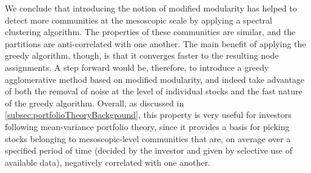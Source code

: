 We conclude that introducing the notion of modified modularity has helped to detect more communities at the mesoscopic scale by applying a spectral clustering algorithm.
The properties of these communities are similar, and the partitions are anti-correlated with one another.
The main benefit of applying the greedy algorithm, though, is that it converges faster to the resulting node assignments.
A step forward would be, therefore, to introduce a greedy agglomerative method based on modified modularity, and indeed take advantage of both the removal of noise at the level of individual stocks and the fast nature of the greedy algorithm.
Overall, as discussed in \cref{subsec:portfolioTheoryBackground}, this property is very useful for investors following mean-variance portfolio theory, since it provides a basis for picking stocks belonging to mesoscopic-level communities that are, on average over a specified period of time (decided by the investor and given by selective use of available data), negatively correlated with one another.

